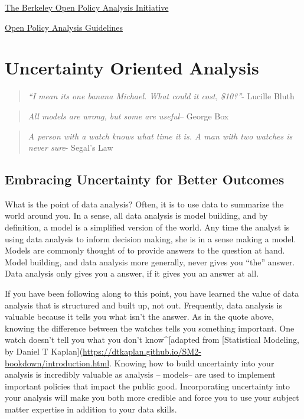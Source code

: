 \documentclass[]{book}
\begin{document}
\href{https://www.bitss.org/opa/}{The Berkeley Open Policy Analysis Initiative}

\href{https://www.bitss.org/wp-content/uploads/2019/03/OPA-Guidelines.pdf}{Open Policy Analysis Guidelines}

\hypertarget{uncertainty-oriented-analysis}{%
\chapter{Uncertainty Oriented Analysis}\label{uncertainty-oriented-analysis}}

\begin{quote}
\emph{``I mean its one banana Michael. What could it cost, \$10?''}- Lucille Bluth
\end{quote}

\begin{quote}
\emph{All models are wrong, but some are useful}-- George Box
\end{quote}

\begin{quote}
\emph{A person with a watch knows what time it is. A man with two watches is never sure}- Segal's Law
\end{quote}

\hypertarget{embracing-uncertainty-for-better-outcomes}{%
\section{Embracing Uncertainty for Better Outcomes}\label{embracing-uncertainty-for-better-outcomes}}

What is the point of data analysis? Often, it is to use data to summarize the world around you. In a sense, all data analysis is model building, and by definition, a model is a simplified version of the world. Any time the analyst is using data analysis to inform decision making, she is in a sense making a model. Models are commonly thought of to provide answers to the question at hand. Model building, and data analysis more generally, never gives you ``the'' answer. Data analysis only gives you a answer, if it gives you an answer at all.

If you have been following along to this point, you have learned the value of data analysis that is structured and built up, not out. Frequently, data analysis is valuable because it tells you what isn't the answer. As in the quote above, knowing the difference between the watches tells you something important. One watch doesn't tell you what you don't know\^{}{[}adapted from {[}Statistical Modeling, by Daniel T Kaplan{]}(\url{https://dtkaplan.github.io/SM2-bookdown/introduction.html}. Knowing how to build uncertainty into your analysis is incredibly valuable as analysis -- models-- are used to implement important policies that impact the public good. Incorporating uncertainty into your analysis will make you both more credible and force you to use your subject matter expertise in addition to your data skills.
\end{document}
